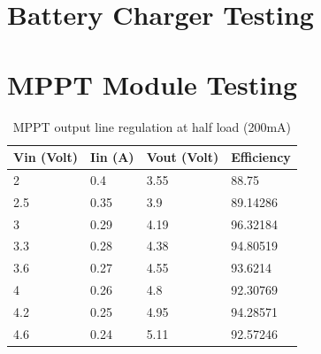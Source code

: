 \section{Battery Charger Testing}

\section{MPPT Module Testing}

\begin{table}[h]
\centering
\begin{tabular}{|l|l|l|l|}
\hline
Vin (Volt) & Iin (A) & Vout (Volt) & Efficiency \\ \hline
2          & 0.4     & 3.55        & 88.75      \\ \hline
2.5        & 0.35    & 3.9         & 89.14286   \\ \hline
3          & 0.29    & 4.19        & 96.32184   \\ \hline
3.3        & 0.28    & 4.38        & 94.80519   \\ \hline
3.6        & 0.27    & 4.55        & 93.6214    \\ \hline
4          & 0.26    & 4.8         & 92.30769   \\ \hline
4.2        & 0.25    & 4.95        & 94.28571   \\ \hline
4.6        & 0.24    & 5.11        & 92.57246   \\ \hline
\end{tabular}
\caption{MPPT output line regulation at half load (200mA)}
\label{table:4}
\end{table}	







